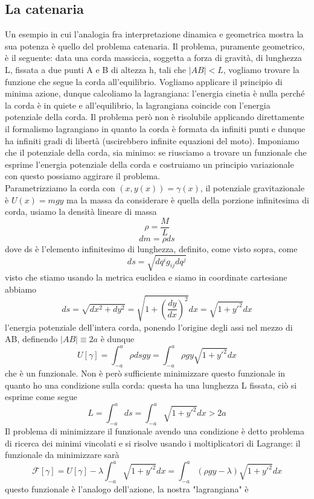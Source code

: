 \documentclass[
10pt, %
a4paper, %
oneside, %
headinclude,footinclude, %
BCOR5mm, %
]{scrartcl}
\begin{document}
\subsection{La catenaria}
Un esempio in cui l'analogia fra interpretazione dinamica e geometrica mostra la sua potenza è quello del problema catenaria. Il problema, puramente geometrico, è il seguente: data una corda massiccia, soggetta a forza di gravità, di lunghezza L, fissata a due punti A e B di altezza h, tali che \(|AB|<L\), vogliamo trovare la funzione che segue la corda all'equilibrio. Vogliamo applicare il principio di minima azione, dunque calcoliamo la lagrangiana: l'energia cinetia è nulla perché la corda è in quiete e all'equilibrio, la lagrangiana coincide con l'energia potenziale della corda. Il problema però non è risolubile applicando direttamente il formalismo lagrangiano in quanto la corda è formata da infiniti punti e dunque ha infiniti gradi di libertà (uscirebbero infinite equazioni del moto). Imponiamo che il potenziale della corda, sia minimo: se riusciamo a trovare un funzionale che esprime l'energia potenziale della corda e costruiamo un principio variazionale con questo possiamo aggirare il problema. \\
Parametrizziamo la corda con \((x, y(x)) = \gamma(x)\), il potenziale gravitazionale è \(U(x) = mgy\) ma la massa da considerare è quella della porzione infinitesima di corda, usiamo la densità lineare di massa
\[\rho = \frac{M}{L}\]
\[dm = \rho ds\]
dove ds è l'elemento infinitesimo di lunghezza, definito, come visto sopra, come
\[ds = \sqrt{dq^ig_{ij}dq^j}\]
visto che stiamo usando la metrica euclidea e siamo in coordinate cartesiane abbiamo
\[ds = \sqrt{dx^2+dy^2} = \sqrt{1+\left(\frac{dy}{dx}\right)^2}dx =\sqrt{1+y'^2}dx \]
l'energia potenziale dell'intera corda, ponendo l'origine degli assi nel mezzo di AB, definendo \(|AB|\equiv 2a\) è dunque
\[U[\gamma] = \int^{a}_{-a}\rho ds g y = \int^{a}_{-a}\rho g y\sqrt{1+y'^2}dx\]
che è un funzionale. Non è però sufficiente minimizzare questo funzionale in quanto ho una condizione sulla corda: questa ha una lunghezza L fissata, ciò si esprime come segue
\[L = \int^{a}_{-a}ds = \int^{a}_{-a}\sqrt{1+y'^2}dx>2a\]
Il problema di minimizzare il funzionale avendo una condizione è detto problema di ricerca dei minimi vincolati e si risolve usando i moltiplicatori di Lagrange: il funzionale da minimizzare sarà
\[\mathcal{F}[\gamma] = U[\gamma]-\lambda\int^{a}_{-a}\sqrt{1+y'^2}dx = \int^{a}_{-a}(\rho g y - \lambda)\sqrt{1+y'^2}dx \]
questo funzionale è l'analogo dell'azione, la nostra "lagrangiana" è
\end{document}
